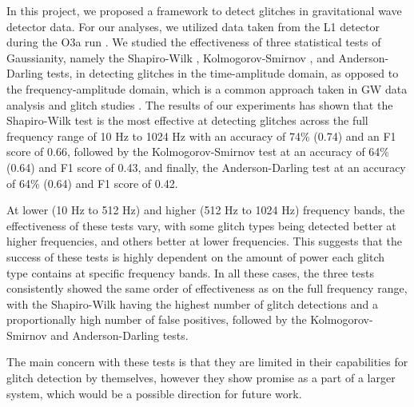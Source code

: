 \documentclass[12pt]{article}
\begin{document}
\noindent In this project, we proposed a framework to detect glitches in gravitational wave detector data. For our analyses, we utilized data taken from the L1 detector during the O3a run \cite{abbott_gwtc-2_2021}. We studied the effectiveness of three statistical tests of Gaussianity, namely the Shapiro-Wilk \cite{Shapiro1965}, Kolmogorov-Smirnov \cite{Kolmogorov_1951}, and Anderson-Darling \cite{anderson1954test} tests, in detecting glitches in the time-amplitude domain, as opposed to the frequency-amplitude domain, which is a common approach taken in GW data analysis and glitch studies \cite{chatterji_multiresolution_2004, vazsonyi_identifying_2023}. The results of our experiments has shown that the Shapiro-Wilk test is the most effective at detecting glitches across the full frequency range of 10 Hz to 1024 Hz with an accuracy of 74\% (0.74) and an F1 score of 0.66, followed by the Kolmogorov-Smirnov test at an accuracy of 64\% (0.64) and F1 score of 0.43, and finally, the Anderson-Darling test at an accuracy of 64\% (0.64) and F1 score of 0.42.

\medskip
\noindent At lower (10 Hz to 512 Hz) and higher (512 Hz to 1024 Hz) frequency bands, the effectiveness of these tests vary, with some glitch types being detected better at higher frequencies, and others better at lower frequencies. This suggests that the success of these tests is highly dependent on the amount of power each glitch type contains at specific frequency bands. In all these cases, the three tests consistently showed the same order of effectiveness as on the full frequency range, with the Shapiro-Wilk having the highest number of glitch detections and a proportionally high number of false positives, followed by the Kolmogorov-Smirnov and Anderson-Darling tests.

\medskip
\noindent The main concern with these tests is that they are limited in their capabilities for glitch detection by themselves, however they show promise as a part of a larger system, which would be a possible direction for future work.




\end{document}
